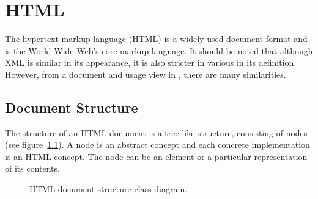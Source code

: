 \documentclass[10pt,a4paper,openany]{mudbook}
\newcommand{\indexrm}[2][]{\textrm{#2}\index{#2#1}}
\begin{document}

\chapter{HTML}
\label{chp:html}

The hypertext markup language (\indexrm{HTML}) \cite{HTML} is a widely used
document format and is the World Wide Web's core markup language.
It should be noted that although \indexrm{XML} is similar in its appearance,
it is also stricter in various in its definition. However, from a document
and usage view in \MUDLib, there are many similarities.

\section{Document Structure}

The structure of an HTML document is a tree like structure, consisting of
nodes (see figure~\ref{fig:xml-doc-class}). A node is an abstract concept
and each concrete implementation is an HTML concept. The node can be an
element or a particular representation of its contents. 

\begin{figure}[hbt]
  \centering
  \caption{HTML document structure class diagram.}
  \label{fig:xml-doc-class}
\end{figure}
\end{document}
